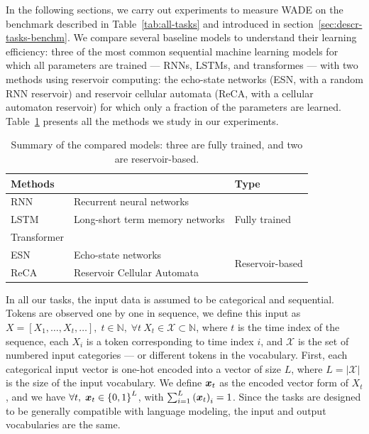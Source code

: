 {In the following sections, we carry out experiments to measure \acf{WADE} on
the benchmark described in Table~\ref{tab:all-tasks} and introduced in section~\ref{sec:descr-tasks-benchm}. We compare several
baseline models to understand their learning efficiency: three of the most common
sequential machine learning models for which all parameters are trained --- RNNs, LSTMs, and transformes --- with two methods using reservoir computing: the echo-state networks
(ESN, with a random RNN reservoir) and reservoir cellular automata (ReCA, with a
cellular automaton reservoir) for which only a fraction of the parameters are
learned. Table~\ref{tab:methods-summary} presents all the methods we study in
our experiments.
\begin{table}[h]
  \centering
  \begin{tabular}{lll}
    \toprule
    \multicolumn{2}{l}{\bfseries Methods} & \bfseries Type \\
    \midrule
   RNN & Recurrent neural networks  & \multirow{3}{*}{Fully trained}\\
   LSTM & Long-short term memory networks  & \\
   Transformer &  & \\
    \midrule
   ESN & Echo-state networks  & \multirow{2}{*}{Reservoir-based}\\
   ReCA & Reservoir Cellular Automata  & \\
    \bottomrule
  \end{tabular}
  \caption{Summary of the compared models: three are fully trained, and two are
    reservoir-based.}
\label{tab:methods-summary}
\end{table}

In all our tasks, the input data is assumed to be categorical and sequential.
Tokens are observed one by one in sequence, we define this input as
$X = [X_{1}, \ldots, X_{t}, \ldots],\; t\in \mathbb{N}, \; \forall t \ X_{t} \in \mathcal{X} \subset \mathbb{N}$, where $t$ is the
time index of the sequence, each $X_{i}$ is a token corresponding to time index
$i$, and $\mathcal{X}$ is the set of numbered input categories --- or different tokens in the
vocabulary. First, each categorical input vector is one-hot encoded into a
vector of size $L$, where $L = |\mathcal{X}|$ is the size of the input vocabulary. We define
${\bm{x}}_{t}$ as the encoded vector form of $X_{t}$, and we have
$\forall t,\; {\bm{x}}_{t} \in {\{0, 1\}}^{L}$, with $\sum_{i = 1}^{L}{({\bm{x}}_{t})}_{i} = 1$.
Since the tasks are designed to be generally compatible with language modeling,
the input and output vocabularies are the same.

}
